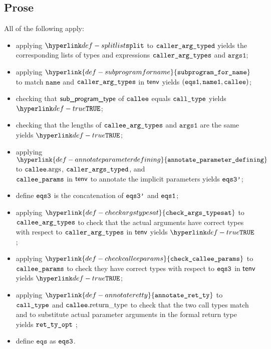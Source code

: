 \documentclass{book}
\newcommand\ProseOrTypeError[0]{\ProseTerminateAs{\TypeErrorConfig}}
\newcommand\checkargstypesat[0]{\hyperlink{def-checkargstypesat}{\texttt{check\_args\_typesat}}}
\newcommand\checkcalleeparams[0]{\hyperlink{def-checkcalleeparams}{\texttt{check\_callee\_params}}}
\newcommand\annotateretty[0]{\hyperlink{def-annotateretty}{\texttt{annotate\_ret\_ty}}}
\newcommand\annotateparameterdefining[0]{\hyperlink{def-annotateparameterdefining}{\texttt{annotate\_parameter\_defining}}}
\newcommand\subprogramforname[0]{\hyperlink{def-subprogramforname}{\texttt{subprogram\_for\_name}}}
\newcommand\eqs[0]{\texttt{eqs}}
\newcommand\nameone[0]{\texttt{name1}}
\newcommand\vargsone[0]{\texttt{args1}}
\newcommand\name[0]{\texttt{name}}
\begin{document}
\subsection{Prose}
All of the following apply:
\begin{itemize}
  \item applying $\splitlist$ to $\texttt{caller\_arg\_typed}$ yields the corresponding lists of types
        and expressions $\texttt{caller\_arg\_types}$ and $\vargsone$;
  \item applying $\subprogramforname$ to match $\name$ and $\texttt{caller\_arg\_types}$ in $\textsf{tenv}$
        yields $(\eqsone, \nameone, \callee)$\ProseOrTypeError;
  \item checking that $\textsf{sub\_program\_type}$ of $\texttt{callee}$ equals $\texttt{call\_type}$ yields $\True$\ProseOrTypeError;
  \item checking that the lengths of $\texttt{callee\_arg\_types}$ and $\vargsone$ are the same yields $\True$\ProseOrTypeError;
  \item applying $\annotateparameterdefining$ to $\texttt{callee}.\text{args}$,
        $\texttt{caller\_args\_typed}$, and \\
        $\texttt{callee\_params}$ in $\textsf{tenv}$ to annotate the implicit parameters
        yields $\texttt{eqs3'}$\ProseOrTypeError;
  \item define $\texttt{eqs3}$ is the concatenation of $\texttt{eqs3'}$ and $\texttt{eqs1}$;
  \item applying $\checkargstypesat$ to $\texttt{callee\_arg\_types}$
        to check that the actual arguments have correct types with respect to $\texttt{caller\_arg\_types}$
        in $\textsf{tenv}$ yields $\True$\ProseOrTypeError;
  \item applying $\checkcalleeparams$ to $\texttt{callee\_params}$ to check they have correct types
        with respect to $\texttt{eqs3}$ in $\textsf{tenv}$ yields $\True$\ProseOrTypeError;
  \item applying $\annotateretty$ to $\texttt{call\_type}$ and $\texttt{callee}.\text{return\_type}$
        to check that the two call types match and to substitute actual parameter arguments in the formal return type
        yields $\texttt{ret\_ty\_opt}$ \ProseOrTypeError;
  \item define $\eqs$ as $\texttt{eqs3}$.
\end{itemize}

\end{document}
